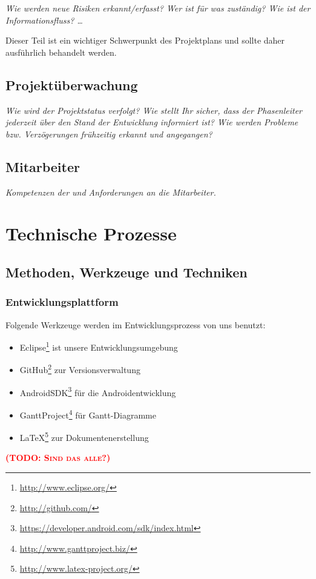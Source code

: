 \documentclass[fontsize=12pt,paper=a4,twoside]{scrartcl}
\newcommand{\todo}[1]{\textbf{\textsc{\textcolor{red}{(TODO: #1)}}}}
\begin{document}
{\em Wie werden neue Risiken erkannt/erfasst? Wer ist für was
  zuständig? Wie ist der Informationsfluss? \ldots 

Dieser Teil ist ein
  wichtiger Schwerpunkt des Projektplans und sollte daher ausführlich
  behandelt werden.}

\subsection{Projektüberwachung}\label{3.4-controlling}
{\em Wie wird der Projektstatus verfolgt? Wie stellt Ihr sicher, dass
  der Phasenleiter jederzeit über den Stand der Entwicklung informiert
  ist? Wie werden Probleme bzw. Verzögerungen frühzeitig erkannt und
  angegangen?}

\subsection{Mitarbeiter}
{\em Kompetenzen der und Anforderungen an die Mitarbeiter.}


\section{Technische Prozesse}
\subsection{Methoden, Werkzeuge und Techniken}
\subsubsection{Entwicklungsplattform}
Folgende Werkzeuge werden im Entwicklungsprozess von uns benutzt:
\begin{itemize}

\item{Eclipse\footnote{\url{http://www.eclipse.org/}} ist unsere Entwicklungsumgebung}
\item{GitHub\footnote{\url{http://github.com/}} zur Versionsverwaltung}
\item{AndroidSDK\footnote{\url{https://developer.android.com/sdk/index.html}} für die Androidentwicklung}
\item{GanttProject\footnote{\url{http://www.ganttproject.biz/}}} für Gantt-Diagramme
\item{\LaTeX{}\footnote{\url{http://www.latex-project.org/}}} zur Dokumentenerstellung

\end{itemize}
\todo{Sind das alle?}
\end{document}
